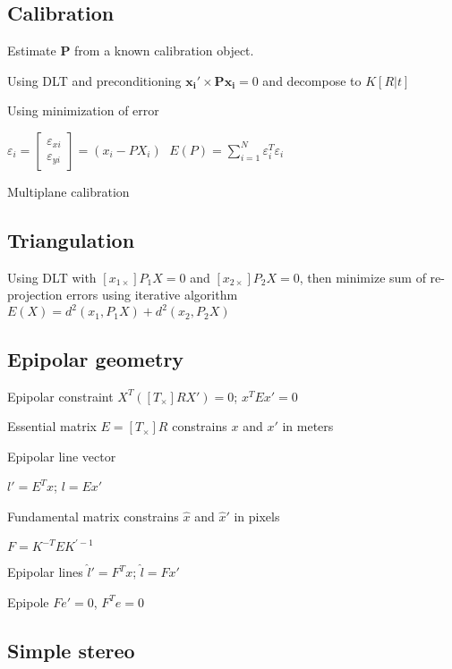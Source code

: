 \documentclass{article}
\begin{document}
\begin{multicols*}{2}
{	\subsection{Calibration}

	Estimate $\mathbf{P}$ from a known calibration object.

	\begin{compactitem}
		\item Using DLT and preconditioning
		$\mathbf{x_i' \times P x_i} = 0$
		and decompose to  $K[R|t]$

		\item Using minimization of error

		$\varepsilon_i = \left[ \begin{array}{c}
					\varepsilon_{xi} \\ \varepsilon_{yi}
				\end{array} \right] = (x_i - PX_i)\;$
		$E(P)=\sum_{i=1}^{N}\varepsilon_i^T\varepsilon_i$

		\item Multiplane calibration
	\end{compactitem}

	\subsection{Triangulation}

	Using DLT with $[x_{1 \times}]P_1X=0$ and $[x_{2 \times}]P_2X=0$,
	then minimize sum of re-projection errors using iterative algorithm
	$E(X) = d^2(x_1,P_1X) + d^2(x_2,P_2X)$

	\subsection{Epipolar geometry}

	Epipolar constraint $X^T([T_\times]RX') = 0$; $x^T E x' = 0$

	Essential matrix $E=[T_\times] R$ constrains $x$ and $x'$ in meters

	Epipolar line vector

	$l' = E^Tx$;
	$l = Ex'$

	Fundamental matrix constrains $\hat{x}$ and $\hat{x}'$ in pixels

	$ F = K^{-T}EK^{'-1}$

	Epipolar lines
	$\hat{l}' = F^Tx$;
	$\hat{l} = Fx'$


	Epipole $Fe' = 0$, $F^Te = 0$

	\subsection{Simple stereo}

}
\end{multicols*}
\end{document}
